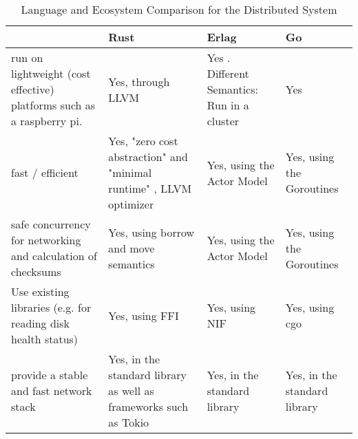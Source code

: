 \begin{table}[h]
	\centering
	\caption{Language and Ecosystem Comparison for the Distributed System}
	\label{language-comparison-ds}
	\begin{tabu}{X|X X X}
		\hline
		& Rust
		& Erlag
		& Go
		\\ \hline

		run on lightweight (cost effective) platforms such as a raspberry pi.
		& Yes, through LLVM \cite{rust-blog-introducing-mir}
		& Yes \cite{erlang-faq-implementations}. Different Semantics: Run in a cluster
		& Yes \cite{go-github-minimum-requirements}
		\\
		
		fast / efficient
		& Yes, "zero cost abstraction" and "minimal runtime" \cite{rustlang-org}, LLVM optimizer \cite{rust-blog-introducing-mir}
		& Yes, using the Actor Model \cite{hebert_learn_you_some_erlang}
		& Yes, using the Goroutines \cite{doxsey_introduction_2012}
		\\
		
		safe concurrency for networking and calculation of checksums
		& Yes, using borrow and move semantics \cite{rust-book-concurrency}
		& Yes, using the Actor Model \cite{hebert_learn_you_some_erlang}
        & Yes, using the Goroutines \cite{doxsey_introduction_2012}
		\\
		
		Use existing libraries (e.g. for reading disk health status)
		& Yes, using FFI \cite{rust-book-concurrency}
		& Yes, using NIF \cite{erlang-org-nif}
		& Yes, using cgo \cite{golang-org-cgo}
		\\
		
		provide a stable and fast network stack
		& Yes, in the standard library as well as frameworks such as Tokio \cite{tokio-rs}
		& Yes, in the standard library \cite{erlang-org}
		& Yes, in the standard library \cite{golang-org}
		\\
		
	\end{tabu}
\end{table}

